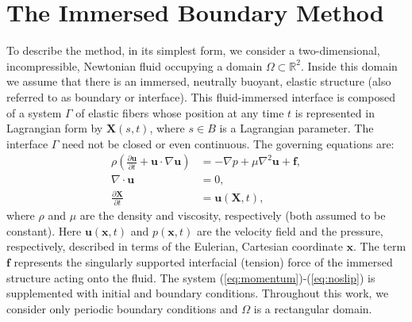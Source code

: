 \documentclass[preprint,12pt]{elsarticle}
\begin{document}
 \section{The Immersed Boundary Method}
 \label{Sec:IB}
To describe the method,  in its simplest form, we 
consider a two-dimensional, incompressible, Newtonian fluid occupying a domain $\Omega \subset \mathbb{R}^2$. Inside this domain
we assume that there is an immersed, neutrally buoyant, elastic structure (also referred to as boundary or interface). This fluid-immersed interface is composed of a system  $\Gamma$ of elastic fibers whose position at any time $t$ is represented in Lagrangian form by $\mathbf{X}(s,t)$, where $s \in B$ is a Lagrangian parameter. The interface $\Gamma$
need not be closed or even continuous. The governing equations are:
\begin{align}
\rho \left(\frac{\partial \mathbf{u}}{\partial t} + \mathbf{u}\cdot\nabla\mathbf{u} \right) &= -\nabla p + \mu\nabla^2 \mathbf{u} + \mathbf{f}, \label{eq:momentum}\\ 
\nabla \cdot \mathbf{u} &= 0, \label{eq:incompressibility}\\
\frac{\partial \mathbf{X}}{\partial t}  &= \mathbf{u}(\mathbf{X},t), \label{eq:noslip}
\end{align}
where $\rho$ and $\mu$ are the density and viscosity, respectively (both assumed to be constant). Here $\mathbf{u}(\mathbf{x},t)$ and $p(\mathbf{x},t)$ are the velocity field and the pressure, respectively, described in terms of the Eulerian, Cartesian coordinate $\mathbf{x}$. The term $\mathbf{f}$ represents the singularly supported interfacial (tension) force of the immersed structure acting onto the fluid. The system (\ref{eq:momentum})-(\ref{eq:noslip}) is supplemented with initial and boundary conditions. Throughout this work, we consider only periodic boundary conditions and $\Omega$ is a rectangular domain.
\end{document}
